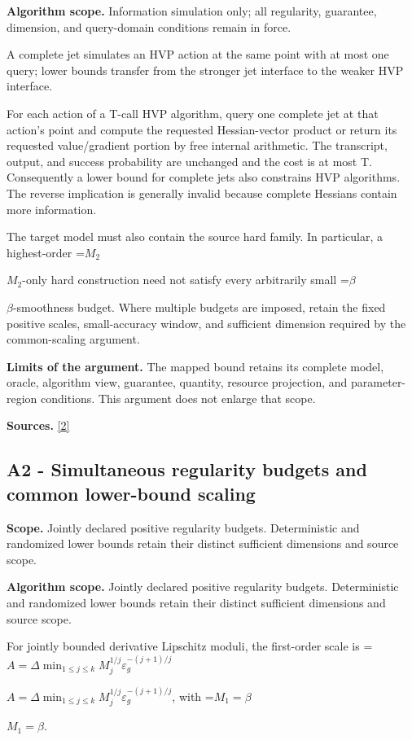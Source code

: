 \documentclass[10pt,a4paper]{article}
\newcommand{\AtlasMath}[1]{\par\begingroup\centering\setbox0=\hbox{$\displaystyle #1$}\ifdim\wd0>1.4\linewidth\typeout{ATLAS WIDE FORMULA: \the\wd0}\fi\ifdim\wd0>\linewidth\resizebox{\linewidth}{!}{\box0}\else\box0\fi\par\endgroup}
\newcommand{\AtlasInlineMath}[1]{\begingroup\setbox0=\hbox{$#1$}\ifdim\wd0>.4\linewidth\endgroup\AtlasMath{#1}\else\endgroup$#1$\fi}
\begin{document}
\textbf{Algorithm scope.} Information simulation only; all regularity, guarantee, dimension, and query-domain conditions remain in force.

A complete jet simulates an HVP action at the same point with at most one query; lower bounds transfer from the stronger jet interface to the weaker HVP interface.

For each action of a T-call HVP algorithm, query one complete jet at that action's point and compute the requested Hessian-vector product or return its requested value/gradient portion by free internal arithmetic. The transcript, output, and success probability are unchanged and the cost is at most T. Consequently a lower bound for complete jets also constrains HVP algorithms. The reverse implication is generally invalid because complete Hessians contain more information.

The target model must also contain the source hard family. In particular, a highest-order \AtlasInlineMath{M_2}-only hard construction need not satisfy every arbitrarily small \AtlasInlineMath{\beta}-smoothness budget. Where multiple budgets are imposed, retain the fixed positive scales, small-accuracy window, and sufficient dimension required by the common-scaling argument.

\textbf{Limits of the argument.} The mapped bound retains its complete model, oracle, algorithm view, guarantee, quantity, resource projection, and parameter-region conditions. This argument does not enlarge that scope.

\textbf{Sources.} \href{https://arxiv.org/abs/1710.11606v3}{[2]}

\subsection{A2 - Simultaneous regularity budgets and common lower-bound scaling}
\textbf{Scope.} Jointly declared positive regularity budgets. Deterministic and randomized lower bounds retain their distinct sufficient dimensions and source scope.

\textbf{Algorithm scope.} Jointly declared positive regularity budgets. Deterministic and randomized lower bounds retain their distinct sufficient dimensions and source scope.

For jointly bounded derivative Lipschitz moduli, the first-order scale is \AtlasInlineMath{A=\Delta\min_{1\le j\le k}M_j^{1/j}\varepsilon_g^{-(j+1)/j}}, with \AtlasInlineMath{M_1=\beta}.
\end{document}
